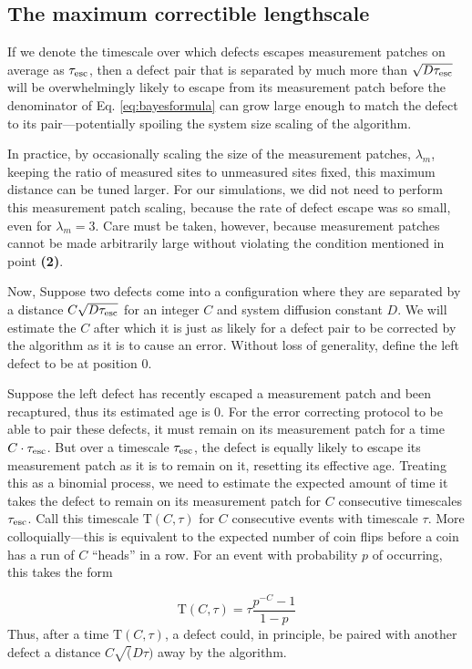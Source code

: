 \documentclass[twocolumn,superscriptaddress,aps,prb,floatfix]{revtex4-1}
\newcommand{\te}{\tau_{\rm{esc}}}
\newcommand{\Tau}{\mathrm{T}}
\begin{document}
\subsection{The maximum correctible lengthscale}

 If we denote the timescale over which defects escapes measurement patches on average as $\te$, then a defect pair that is separated by much more than $\sqrt{D \te}$ will be overwhelmingly likely to escape from its measurement patch before the denominator of Eq. \eqref{eq:bayesformula} can grow large enough to match the defect to its pair---potentially spoiling the system size scaling of the algorithm.
 
 In practice, by occasionally scaling the size of the measurement patches, $\lambda_m$, keeping the ratio of measured sites to unmeasured sites fixed, this maximum distance can be tuned larger.  For our simulations, we did not need to perform this measurement patch scaling, because the rate of defect escape was so small, even for $\lambda_m=3$.  Care must be taken, however, because measurement patches cannot be made arbitrarily large without violating the condition mentioned in point \textbf{(2)}. 

 Now, Suppose two defects come into a configuration where they are separated by a distance $C \sqrt{D \te}$ for an integer $C$ and system diffusion constant $D$.  We will estimate the $C$ after which it is just as likely for a defect pair to be corrected by the algorithm as it is to cause an error.  Without loss of generality, define the left defect to be at position $0$.

 Suppose the left defect has recently escaped a measurement patch and been recaptured, thus its estimated age is $0$.  For the error correcting protocol to be able to pair these defects, it must remain on its measurement patch for a time $C\cdot \te$.  But over a timescale $\te$, the defect is equally likely to escape its measurement patch as it is to remain on it, resetting its effective age.  Treating this as a binomial process, we need to estimate the expected amount of time it takes the defect to remain on its measurement patch for $C$ consecutive timescales $\te$.  Call this timescale $\Tau(C,\tau)$ for $C$ consecutive events with timescale $\tau$.  More colloquially---this is equivalent to the expected number of coin flips before a coin has a run of $C$ ``heads'' in a row.  For an event with probability $p$ of occurring, this takes the form

\begin{equation}
\Tau(C,\tau) = \tau \frac{p^{-C} - 1}{1 - p}
\end{equation}
\noindent
Thus, after a time $\Tau(C,\tau)$, a defect could, in principle, be paired with another defect a distance $C \sqrt(D \tau)$ away by the algorithm.
\end{document}
